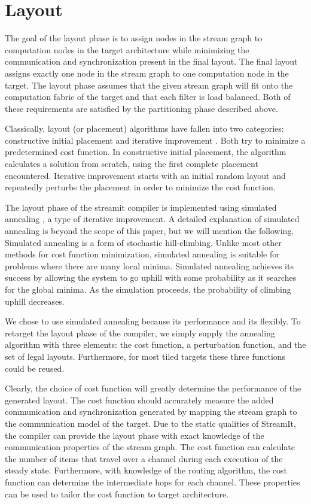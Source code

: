 \section{Layout}
\label{sec:layout}

The goal of the layout phase is to assign nodes in the stream graph to
computation nodes in the target architecture while minimizing the
communication and synchronization present in the final layout.  The
final layout assigns exactly one node in the stream graph to one
computation node in the target.  The layout phase assumes that the
given stream graph will fit onto the computation fabric of the target
and that each filter is load balanced.  Both of these requirements are
satisfied by the partitioning phase described above.

Classically, layout (or placement) algorithms have fallen into two
categories: constructive initial placement and iterative improvement
\cite{layout}.  Both try to minimize a predetermined cost
function.  In constructive initial placement, the algorithm calculates
a solution from scratch, using the first complete placement
encountered.  Iterative improvement starts with an initial random
layout and repeatedly perturbs the placement in order to minimize the
cost function.

The layout phase of the streamit compiler is implemented using
simulated annealing \cite{simanneal}, a type of
iterative improvement.  A detailed explanation of simulated annealing
is beyond the scope of this paper, but we will mention the following.
Simulated annealing is a form of stochastic hill-climbing. Unlike most
other methods for cost function minimization, simulated annealing is
suitable for problems where there are many local minima.  Simulated
annealing achieves its success by allowing the system to go uphill
with some probability as it searches for the global minima.  As the
simulation proceeds, the probability of climbing uphill decreases.
  
We chose to use simulated annealing because its performance and its
flexibly.  To retarget the layout phase of the compiler, we simply
supply the annealing algorithm with three elements: the cost function,
a perturbation function, and the set of legal layouts.  Furthermore,
for most tiled targets these three functions could be reused.

Clearly, the choice of cost function will greatly determine the
performance of the generated layout.  The cost function should
accurately measure the added communication and synchronization
generated by mapping the stream graph to the communication model of
the target.  Due to the static qualities of StreamIt, the compiler can
provide the layout phase with exact knowledge of the communication
properties of the stream graph.  The cost function can calculate the
number of items that travel over a channel during each execution of
the steady state.  Furthermore, with knowledge of the routing
algorithm, the cost function can determine the intermediate hops for
each channel.  These properties can be used to tailor the cost
function to target architecture.

